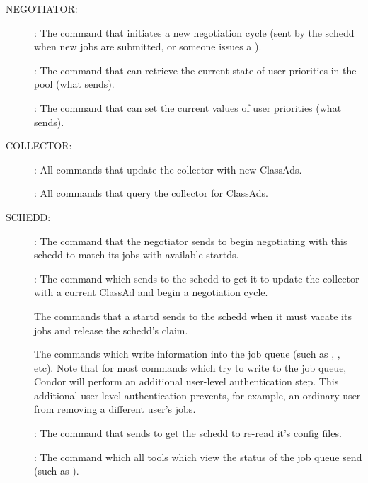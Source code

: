 NEGOTIATOR:

\begin{description}
\item[] : The command that initiates a new negotiation
  cycle (sent by the schedd when new jobs are submitted, or someone
  issues a ).

\item[] : The command that can retrieve the current state
  of user priorities in the pool (what  sends).

\item[] : The command that can set the current
  values of user priorities (what  sends).
\end{description}

COLLECTOR:

\begin{description}
\item[] : All commands that update the collector with
new ClassAds.

\item[] : All commands that query the collector for
ClassAds.
\end{description}

SCHEDD: 

\begin{description}
\item[] : The command that the negotiator sends to
  begin negotiating with this schedd to match its jobs with available
  startds.

\item[] : The command which  sends to
  the schedd to get it to update the collector with a current ClassAd
  and begin a negotiation cycle.

  The commands that a startd sends to the schedd when it must vacate
  its jobs and release the schedd's claim.

  The commands which write information into the job queue (such as
  , , etc).  
  Note that for most commands which try to write to the job queue, Condor
  will perform an additional user-level authentication step.  
  This additional user-level authentication prevents, for example, an
  ordinary user from removing a different user's jobs.

\item[] : The command that 
  sends to get the schedd to re-read it's config files.

\item[] : The command which all
  tools which view the status of the job queue send (such as
  ).  
\end{description}

